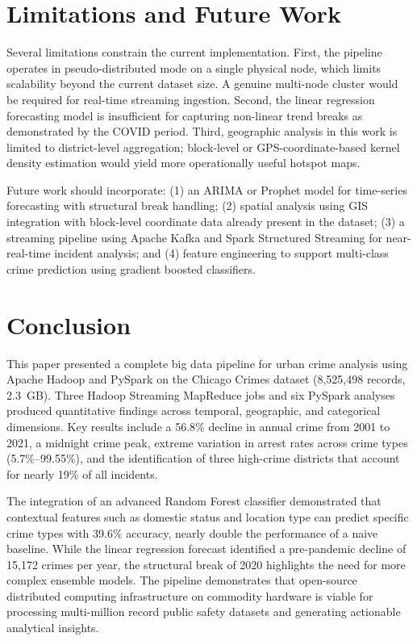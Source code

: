 \documentclass[conference]{IEEEtran}
\begin{document}
\section{Limitations and Future Work}

Several limitations constrain the current implementation. First, the pipeline
operates in pseudo-distributed mode on a single physical node, which limits
scalability beyond the current dataset size. A genuine multi-node cluster would
be required for real-time streaming ingestion. Second, the linear regression
forecasting model is insufficient for capturing non-linear trend breaks as
demonstrated by the COVID period. Third, geographic analysis in this work is
limited to district-level aggregation; block-level or GPS-coordinate-based
kernel density estimation would yield more operationally useful hotspot maps.

Future work should incorporate: (1) an ARIMA or Prophet model for time-series
forecasting with structural break handling; (2) spatial analysis using GIS
integration with block-level coordinate data already present in the dataset;
(3) a streaming pipeline using Apache Kafka and Spark Structured Streaming for
near-real-time incident analysis; and (4) feature engineering to support
multi-class crime prediction using gradient boosted classifiers.

\section{Conclusion}

This paper presented a complete big data pipeline for urban crime analysis using
Apache Hadoop and PySpark on the Chicago Crimes dataset (8,525,498 records,
2.3~GB). Three Hadoop Streaming MapReduce jobs and six PySpark analyses produced
quantitative findings across temporal, geographic, and categorical dimensions. Key
results include a 56.8\% decline in annual crime from 2001 to 2021, a midnight
crime peak, extreme variation in arrest rates across crime types (5.7\%--99.55\%),
and the identification of three high-crime districts that account for nearly 19\%
of all incidents.

The integration of an advanced Random Forest classifier demonstrated that contextual
features such as domestic status and location type can predict specific crime types
with 39.6\% accuracy, nearly double the performance of a naive baseline. While the
linear regression forecast identified a pre-pandemic decline of 15,172 crimes per year,
the structural break of 2020 highlights the need for more complex ensemble models.
The pipeline demonstrates that open-source distributed computing infrastructure
on commodity hardware is viable for processing multi-million record public safety
datasets and generating actionable analytical insights.
\end{document}
